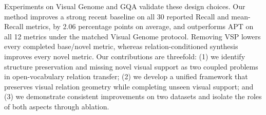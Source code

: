 Experiments on Visual Genome and GQA validate these design choices. Our method
improves a strong recent baseline on all 30 reported Recall and
mean-Recall metrics, by 2.06 percentage points on average, and outperforms APT
on all 12 metrics under the matched Visual Genome protocol. Removing VSP lowers
every completed base/novel metric, whereas relation-conditioned synthesis
improves every novel metric. Our contributions are threefold: (1) we identify
structure preservation and missing novel visual support as two coupled problems
in open-vocabulary relation transfer; (2) we develop a unified framework that
preserves visual relation geometry while completing unseen visual support; and
(3) we demonstrate consistent improvements on two datasets and isolate the
roles of both aspects through ablation.
